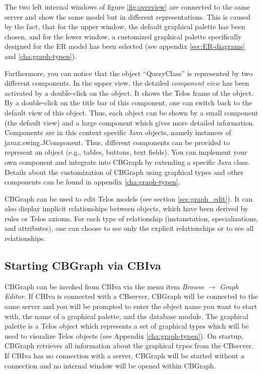 The two left internal windows of figure \ref{fig:overview} are connected to the same
server and show the same model but in different representations. This is caused by the fact,
that for the upper window, the default graphical palette has been
chosen, and for the lower window, a customized graphical palette specifically
designed for the ER model has been selected (see appendix \ref{sec:ER-diagrams}
and \ref{cha:graph-typen}).

Furthermore, you can notice that the object ``QueryClass'' is represented
by two different components. In the upper view, the detailed {\em component view}
has been activated by a double-click on the object. It shows the Telos
frame of the object. By a double-click on the title bar of this component,
one can switch back to the default view of this object. Thus, each object
can be shown by a small component (the default view) and a large
component which gives more detailed information. Components are in this
context specific Java objects, namely instances of javax.swing.JComponent.
Thus, different components can be provided to represent an object (e.g.,
tables, buttons, text fields). You can implement your own component
and integrate into CBGraph by extending a specific Java class.
Details about the customization of CBGraph using graphical
types and other components can be found in appendix \ref{cha:graph-typen}.

CBGraph can be used to edit Telos models (see section
\ref{sec:graph_edit}). It can also display implicit
relationships between objects, which have been derived by rules or Telos
axioms. For each type of relationship (instanstation, specializations, and
attributes), one can choose to see only the explicit relationships or to see
all relationships.

\subsection{Starting CBGraph via CBIva}

CBGraph can be invoked from CBIva
via the menu item {\em Browse} $\rightarrow$ {\em Graph Editor}.
If CBIva is connected with a CBserver, CBGraph will be
connected to the same server and you will be prompted to enter the object
name you want to start with, the name of a graphical palette, and the database module. The
graphical palette is a Telos object which represents a set of
graphical types which will be used to visualize Telos objects (see
Appendix \ref{cha:graph-typen}). On startup, CBGraph
retrieves all information about the graphical types from the CBserver.
If CBIva has no connection with
a server, CBGraph will be started without a connection
and no internal window will be opened within CBGraph.

